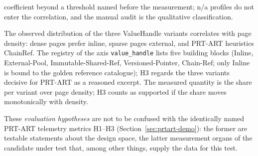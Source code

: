 \begin{description}
  coefficient beyond a threshold named before the measurement; n/a profiles do not enter the
  correlation, and the manual audit is the qualitative classification.
  \item[H3 (inline vs.\ external vs.\ chain distribution)] The observed distribution of the three
  ValueHandle variants correlates with page density: dense pages prefer inline, sparse pages external,
  and PRT-ART heuristics ChainRef. The registry of the axis \texttt{value\_handle} lists five
  building blocks (Inline, External-Pool, Immutable-Shared-Ref, Versioned-Pointer, Chain-Ref; only
  Inline is bound to the golden reference catalogue); H3 regards the three variants decisive for
  PRT-ART as a reasoned excerpt. The measured quantity is the share per variant over page density; H3
  counts as supported if the share moves monotonically with density.
\end{description}
These \emph{evaluation hypotheses} are not to be confused with the identically named PRT-ART telemetry
metrics H1--H3 (Section~\ref{sec:prtart-demo}): the former are testable statements about the design
space, the latter measurement organs of the candidate under test that, among other things, supply the data for this
test.


